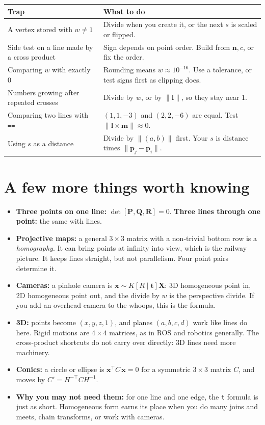 \documentclass[11pt,a4paper]{article}
\newcommand{\vect}[1]{\mathbf{#1}}
\newcommand{\T}{^{\top}}
\newcommand{\vP}{\vect{P}}
\newcommand{\vQ}{\vect{Q}}
\newcommand{\vl}{\vect{l}}
\newcommand{\vm}{\vect{m}}
\begin{document}
\begin{center}
\begin{tabular}{p{}p{}}
\toprule
\textbf{Trap} & \textbf{What to do}\\
\midrule
A vertex stored with $w\ne1$ & Divide when you create it, or the next $s$ is scaled or flipped.\\
Side test on a line made by a cross product & Sign depends on point order. Build from $\vect{n},c$, or fix the order.\\
Comparing $w$ with exactly 0 & Rounding means $w\approx10^{-16}$. Use a tolerance, or test signs first as clipping does.\\
Numbers growing after repeated crosses & Divide by $w$, or by $\|\vl\|$, so they stay near 1.\\
Comparing two lines with \texttt{==} & $(1,1,-3)$ and $(2,2,-6)$ are equal. Test $\|\vl\times\vm\|\approx0$.\\
Using $s$ as a distance & Divide by $\|(a,b)\|$ first. Your $s$ is distance times $\|\vect{p}_j-\vect{p}_i\|$.\\
\bottomrule
\end{tabular}
\end{center}

\section{A few more things worth knowing}

\begin{itemize}
\item \textbf{Three points on one line:} $\det[\vP,\vQ,\vect{R}]=0$. \textbf{Three lines through one point:} the same with lines.
\item \textbf{Projective maps:} a general $3\times3$ matrix with a non-trivial bottom row is a \emph{homography}. It can bring
points at infinity into view, which is the railway picture. It keeps lines straight, but not parallelism. Four point pairs
determine it.
\item \textbf{Cameras:} a pinhole camera is $\vect{x}\sim K[R\mid\vect{t}]\vect{X}$: 3D homogeneous point in, 2D homogeneous point
out, and the divide by $w$ is the perspective divide. If you add an overhead camera to the whoops, this is the formula.
\item \textbf{3D:} points become $(x,y,z,1)$, and planes $(a,b,c,d)$ work like lines do here. Rigid motions are $4\times4$ matrices,
as in ROS and robotics generally. The cross-product shortcuts do not carry over directly: 3D lines need more machinery.
\item \textbf{Conics:} a circle or ellipse is $\vect{x}\T C\,\vect{x}=0$ for a symmetric $3\times3$ matrix $C$, and moves by
$C'=H^{-\top}CH^{-1}$.
\item \textbf{Why you may not need them:} for one line and one edge, the \texttt{t} formula is just as short. Homogeneous form earns
its place when you do many joins and meets, chain transforms, or work with cameras.
\end{itemize}
\end{document}
